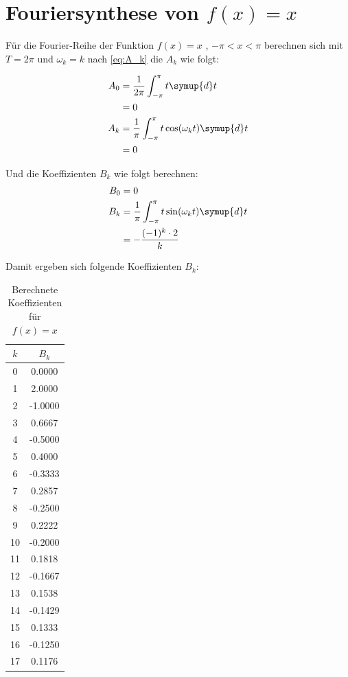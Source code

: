 \section{Fouriersynthese von $f(x)=x$}

Für die Fourier-Reihe der Funktion $f(x)=x$ , $-\pi < x < \pi$ berechnen sich mit $T=2\pi$ und $\omega_k = k$ nach \autoref{eq:A_k} die $A_k$ wie folgt:

\begin{align*}
  A_0 &= \frac{1}{2\pi} \int_{-\pi}^{\pi} t \symup{d}t \\
  &= 0 \\
  A_k &= \frac{1}{\pi} \int_{-\pi}^{\pi} t \cos(\omega_k t) \symup{d}t \\
  &= 0
\end{align*}

Und die Koeffizienten $B_k$ wie folgt berechnen:
\begin{align*}
  B_0 &= 0 \\
  B_k &= \frac{1}{\pi} \int_{-\pi}^{\pi} t \sin(\omega_k t) \symup{d}t \\
  &= - \frac{(-1)^k \cdot 2}{k}
\end{align*}

Damit ergeben sich folgende Koeffizienten $B_k$:

\begin{table}
  \centering
  \caption{Berechnete Koeffizienten für $f(x)=x$}
  \label{tab:b_x}
  \begin{tabular}{c c}
    \toprule 
    $k$ & $B_k$ \\ 
    \midrule 
    0 & 0.0000 \\
    1 & 2.0000 \\
    2 & -1.0000 \\
    3 & 0.6667 \\
    4 & -0.5000 \\
    5 & 0.4000 \\
    6 & -0.3333 \\
    7 & 0.2857 \\
    8 & -0.2500 \\
    9 & 0.2222 \\
    10 & -0.2000 \\
    11 & 0.1818 \\
    12 & -0.1667 \\
    13 & 0.1538 \\
    14 & -0.1429 \\
    15 & 0.1333 \\
    16 & -0.1250 \\
    17 & 0.1176 \\ 
    \bottomrule
  \end{tabular}
\end{table} 

